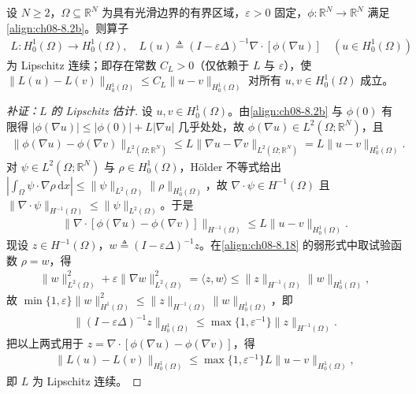 \documentclass[../../main.tex]{subfiles}%
\begin{document}
\begin{proposition}\label{proposition:ch08-Lipschitz算子}
设 $N\geqslant2$，$\Omega\subseteq\mathbb{R}^N$ 为具有光滑边界的有界区域，$\varepsilon>0$ 固定，$\phi:\mathbb{R}^N\to\mathbb{R}^N$ 满足\eqref{align:ch08-8.2b}。则算子
\begin{align}
L:H^1_0(\Omega)\to H^1_0(\Omega),\quad
L(u)\triangleq (I-\varepsilon\Delta)^{-1}\nabla\cdot[\phi(\nabla u)]\quad(u\in H^1_0(\Omega)) \label{align:ch08-8.19}
\end{align}
为 Lipschitz 连续；即存在常数 $C_L>0$（仅依赖于 $L$ 与 $\varepsilon$），使 $\|L(u)-L(v)\|_{H^1_0(\Omega)}\leqslant C_L\|u-v\|_{H^1_0(\Omega)}$ 对所有 $u,v\in H^1_0(\Omega)$ 成立。
\end{proposition}

\begin{proof}[补证：$L$ 的 Lipschitz 估计]
设 $u,v\in H^1_0(\Omega)$。由\eqref{align:ch08-8.2b} 与 $\phi(0)$ 有限得 $|\phi(\nabla u)|\leqslant|\phi(0)|+L|\nabla u|$ 几乎处处，故 $\phi(\nabla u)\in L^2(\Omega;\mathbb{R}^N)$，且
\begin{align*}
\|\phi(\nabla u)-\phi(\nabla v)\|_{L^2(\Omega;\mathbb{R}^N)}
\leqslant L\|\nabla u-\nabla v\|_{L^2(\Omega;\mathbb{R}^N)}=L\|u-v\|_{H^1_0(\Omega)}.
\end{align*}
对 $\psi\in L^2(\Omega;\mathbb{R}^N)$ 与 $\rho\in H^1_0(\Omega)$，Hölder 不等式给出 $\left|\int_\Omega\psi\cdot\nabla\rho\,\mathrm{d}x\right|\leqslant\|\psi\|_{L^2(\Omega)}\|\rho\|_{H^1_0(\Omega)}$，故 $\nabla\cdot\psi\in H^{-1}(\Omega)$ 且 $\|\nabla\cdot\psi\|_{H^{-1}(\Omega)}\leqslant\|\psi\|_{L^2(\Omega)}$。于是
\begin{align*}
\|\nabla\cdot[\phi(\nabla u)-\phi(\nabla v)]\|_{H^{-1}(\Omega)}\leqslant L\|u-v\|_{H^1_0(\Omega)}.
\end{align*}
现设 $z\in H^{-1}(\Omega)$，$w\triangleq(I-\varepsilon\Delta)^{-1}z$。在\eqref{align:ch08-8.18} 的弱形式中取试验函数 $\rho=w$，得
\begin{align*}
\|w\|^2_{L^2(\Omega)}+\varepsilon\|\nabla w\|^2_{L^2(\Omega)}
=\langle z,w\rangle\leqslant\|z\|_{H^{-1}(\Omega)}\|w\|_{H^1_0(\Omega)},
\end{align*}
故 $\min\{1,\varepsilon\}\|w\|^2_{H^1(\Omega)}\leqslant\|z\|_{H^{-1}(\Omega)}\|w\|_{H^1_0(\Omega)}$，即
\begin{align*}
\|(I-\varepsilon\Delta)^{-1}z\|_{H^1_0(\Omega)}\leqslant\max\{1,\varepsilon^{-1}\}\|z\|_{H^{-1}(\Omega)}.
\end{align*}
把以上两式用于 $z=\nabla\cdot[\phi(\nabla u)-\phi(\nabla v)]$，得
\begin{align*}
\|L(u)-L(v)\|_{H^1_0(\Omega)}\leqslant\max\{1,\varepsilon^{-1}\}L\|u-v\|_{H^1_0(\Omega)},
\end{align*}
即 $L$ 为 Lipschitz 连续。
\end{proof}
\end{document}
